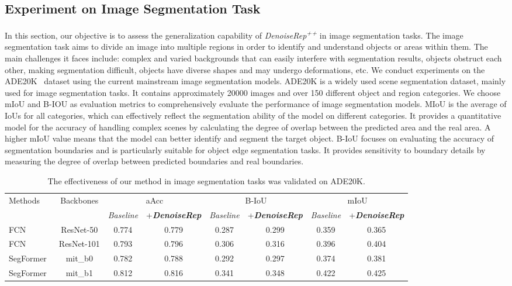 \documentclass[conference]{IEEEtran}
\begin{document}
{\subsection{Experiment on Image Segmentation Task} 
\label{sec: Experiment on Image Segmentation Task}
In this section, our objective is to assess the generalization capability of \textit{DenoiseRep\textsuperscript{++}} in image segmentation tasks. The image segmentation task aims to divide an image into multiple regions in order to identify and understand objects or areas within them. The main challenges it faces include: complex and varied backgrounds that can easily interfere with segmentation results, objects obstruct each other, making segmentation difficult, objects have diverse shapes and may undergo deformations, etc. We conduct experiments on the ADE20K~\cite{zhou2017scene} dataset using the current mainstream image segmentation models. ADE20K is a widely used scene segmentation dataset, mainly used for image segmentation tasks. It contains approximately 20000 images and over 150 different object and region categories. We choose mIoU and B-IOU as evaluation metrics to comprehensively evaluate the performance of image segmentation models. MIoU is the average of IoUs for all categories, which can effectively reflect the segmentation ability of the model on different categories. It provides a quantitative model for the accuracy of handling complex scenes by calculating the degree of overlap between the predicted area and the real area. A higher mIoU value means that the model can better identify and segment the target object. B-IoU focuses on evaluating the accuracy of segmentation boundaries and is particularly suitable for object edge segmentation tasks. It provides sensitivity to boundary details by measuring the degree of overlap between predicted boundaries and real boundaries.



\begin{table}[htbp]
\centering
\caption{The effectiveness of our method in image segmentation tasks was validated on ADE20K.}
\label{tab:image_segmentation_tasks}
\vspace{0.2cm}
\renewcommand{\arraystretch}{1.2} %
\begin{tabular}{l|c|cc|cc|cc}
\hline \hline
\multirow{2}{*}{Methods} & \multirow{2}{*}{Backbones} & \multicolumn{2}{c|}{aAcc} & \multicolumn{2}{c|}{B-IoU} & \multicolumn{2}{c}{mIoU} \\
 & & \textit{Baseline} & +\textit{\textbf{DenoiseRep}} & \textit{Baseline} & +\textit{\textbf{DenoiseRep}} & \textit{Baseline} & +\textit{\textbf{DenoiseRep}} \\
\midrule
FCN~\cite{long2015fully} & ResNet-50  & 0.774 & 0.779 & 0.287 & 0.299 & 0.359 & 0.365 \\
FCN & ResNet-101 & 0.793 & 0.796 & 0.306 & 0.316 & 0.396 & 0.404 \\
SegFormer~\cite{xie2021segformer} & mit\_b0 & 0.782 & 0.788 & 0.292 & 0.297 & 0.374 & 0.381 \\
SegFormer & mit\_b1 & 0.812 & 0.816 & 0.341 & 0.348 & 0.422 & 0.425 \\
\hline \hline
\end{tabular}
\end{table}

}
\end{document}

